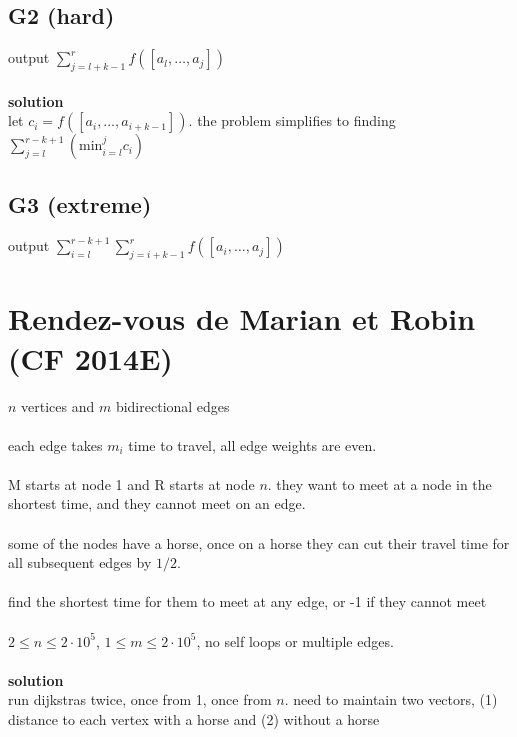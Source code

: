 \documentclass[11pt]{article}
\newcommand{\br}{\\\;\\} %
\newcommand{\soln}{\textbf{solution}\\}
\begin{document}
\subsection{G2 (hard)}
output $\sum_{j=l+k-1}^{r}f([a_{l},\dots,a_{j}])$\br

\soln
let $c_{i} = f([a_{i},\dots,a_{i+k-1}])$. the problem simplifies to finding $\sum_{j=l}^{r-k+1}(\text{min}^{j}_{i=l}c_{i})$

\subsection{G3 (extreme)}
output $\sum_{i=l}^{r-k+1}\sum_{j=i+k-1}^{r}f([a_{i},\dots,a_{j}])$

\section{Rendez-vous de Marian et Robin (CF 2014E)}
$n$ vertices and $m$ bidirectional edges \br each edge takes $m_{i}$ time to travel, all edge weights are even. \br M starts at node 1 and R starts at node $n$. they want to meet at a node in the shortest time, and they cannot meet on an edge. \br some of the nodes have a horse, once on a horse they can cut their travel time for all subsequent edges by $1/2$. \br find the shortest time for them to meet at any edge, or -1 if they cannot meet \br
$2 \leq n \leq 2\cdot 10^{5}$, $1\leq m \leq 2\cdot 10^{5}$, no self loops or multiple edges. \br

\soln run dijkstras twice, once from 1, once from $n$. need to maintain two vectors, (1) distance to each vertex with a horse and (2) without a horse
\end{document}
